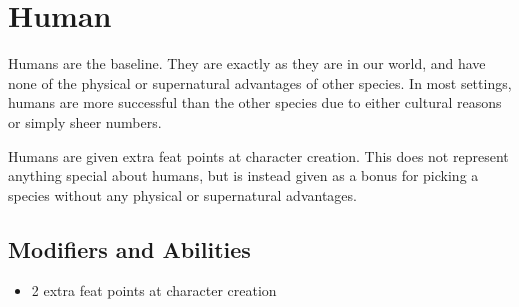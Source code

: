 \section{Human}\label{human}
Humans are the baseline. They are exactly as they are in our world, and have
none of the physical or supernatural advantages of other species. In most
settings, humans are more successful than the other species due to either
cultural reasons or simply sheer numbers.

Humans are given extra feat points at character creation. This does not
represent anything special about humans, but is instead given as a bonus for
picking a species without any physical or supernatural advantages.

\subsection{Modifiers and Abilities}
\begin{itemize}
    \item 2 extra feat points at character creation
\end{itemize}
